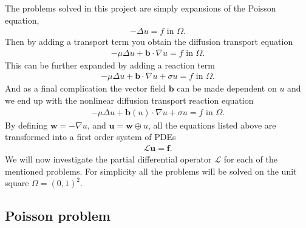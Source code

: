 The problems solved in this project are simply expansions of the Poisson equation,  
%
\begin{align}
	-\Delta u = f \text{  in  } \Omega.
	\label{eq:PoissonImplementation}
\end{align}
%
Then by adding a transport term you obtain the diffusion transport equation
%
\begin{align}
	-\mu \Delta u + \mathbf{b} \cdot \nabla u = f \text{ in } \Omega.
	\label{eq:DiffTransImplementation}
\end{align}
%
This can be further expanded by adding a reaction term
%
\begin{align}
	-\mu \Delta u + \mathbf{b} \cdot \nabla u +\sigma u = f \text{ in } \Omega.
	\label{eq:ReactionImplementation}
\end{align}
%
And as a final complication the vector field $\mathbf{b}$ can be made dependent on $u$ and we end up with the nonlinear diffusion transport reaction equation
%
\begin{align}
	-\mu \Delta u + \mathbf{b}(u) \cdot \nabla u +\sigma u = f \text{ in } \Omega.
	\label{eq:NonlinImplementation}
\end{align}
%
By defining $\mathbf{w}=-\nabla u$, and $ \mathbf{u} = \mathbf{w} \oplus u $, all the equations listed above are transformed into a first order system of PDEs 
%
\begin{align}
	\mathcal{L}\mathbf{u} = \mathbf{f}.
	\label{eq:genFirstOrderFormulation}
\end{align}
%
We will now investigate the partial differential operator $\mathcal{L}$ for each of the mentioned problems. For simplicity all the problems will be solved on the unit square $ \Omega = (0,1)^2$.
%

\subsection{Poisson problem}

